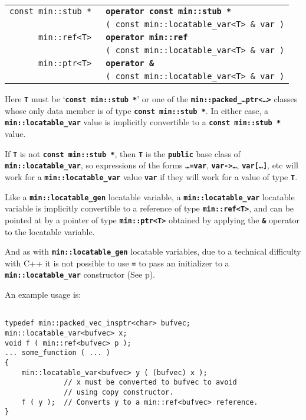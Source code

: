 \documentclass[12pt]{article}
\makeatletter
\newcommand{\TT}[1]{{\tt \bfseries #1}}
\newcommand{\ttomkey}[3]{\TT{operator #2}\index{#1@{\tt operator #2}!{#3}}}
\newcommand{\pagref}[1]{p\pageref{#1}}
\newcommand{\EOL}{\penalty \exhyphenpenalty}
\newcommand{\BRACKETED}[1]{{\tt <#1>}}
\newenvironment{indpar}[1][0.3in]%
	{\begin{list}{}%
		     {\setlength{\itemsep}{0in}%
		      \setlength{\topsep}{0in}%
		      \setlength{\parsep}{1ex}%
		      \setlength{\labelwidth}{#1}%
		      \setlength{\leftmargin}{#1}%
		      \addtolength{\leftmargin}{\labelsep}}%
	 \item}%
	{\end{list}}
\newcommand{\LABEL}[1]{\label{#1}}
\newlength{\ARGBREAKLENGTH}
\newcommand{\ARGBREAK}[1][\ARGBREAKLENGTH]{\\&\hspace*{#1}}
\newcommand{\TTOMKEY}[3]{\ttomkey{#1}{#2}{#3}}
\makeatother
\begin{document}
\begin{indpar}[0.1in]\begin{tabular}{r@{}l}
\verb|const min::stub * |
    & \TTOMKEY{const min::stub *}{const min::stub *}%
              {of {\tt min::locatable\_var\TARG}}\ARGBREAK
      \verb|( const min::locatable_var<T> & var )|
\LABEL{MIN::LOCATABLE_VAR_TO_STUB_PTR} \\
\verb|min::ref<T> |
    & \TTOMKEY{min::ref<T>}{min::ref\TARG}%
              {of {\tt min::locatable\_var\TARG}}\ARGBREAK
      \verb|( const min::locatable_var<T> & var )|
\LABEL{MIN::LOCATABLE_VAR_TO_REF_T} \\
\verb|min::ptr<T> |
    & \TTOMKEY{\&}{\&}%
              {of {\tt min::locatable\_var\TARG}}\ARGBREAK
      \verb|( const min::locatable_var<T> & var )|
\LABEL{MIN::AMPERSAND_LOCATABLE_VAR} \\
\end{tabular}\end{indpar}

Here \TT{T} must be
`\TT{const min::stub~*}'
or one of the \TT{min::\EOL packed\_\ldots ptr\BRACKETED{\ldots}} classes
whose only data member is of type \TT{const min::stub~*}.
In either case, a \TT{min::\EOL locatable\_\EOL var\TARG}
value is implicitly convertible to a \TT{const min::\EOL stub~*} value.

If \TT{T} is not \TT{const min::stub~*}, then \TT{T}
is the \TT{public} base class of
\TT{min::\EOL locatable\_\EOL var\TARG}, so expressions of
the forms \TT{\ldots=var},
\TT{var->\ldots}, \TT{var[\ldots]}, etc will work for a
\TT{min::\EOL locatable\_\EOL var\TARG} value \TT{var} if they
will work for a value of type \TT{T}.

Like a \TT{min::\EOL locatable\_\EOL gen} locatable variable,
a \TT{min::\EOL locatable\_\EOL var\TARG} locatable variable
is implicitly convertible to a
reference of type \TT{min::\EOL ref<T>}, and can be pointed at
by a pointer of type \TT{min::\EOL ptr<T>} obtained by applying
the \TT{\&} operator to the locatable variable.

And as with \TT{min::\EOL locatable\_\EOL gen} locatable variables,
due to a technical difficulty with C++ it is not possible to use
\TT{=} to pass an initializer
to a \TT{min::\EOL locatable\_\EOL var\TARG} constructor
(See \pagref{LOCATABLE-VAR-COPY-CONSTRUCTOR}).

An example usage is:

\begin{indpar}\begin{verbatim}

typedef min::packed_vec_insptr<char> bufvec;
min::locatable_var<bufvec> x;
void f ( min::ref<bufvec> p );
... some_function ( ... )
{
    min::locatable_var<bufvec> y ( (bufvec) x );
              // x must be converted to bufvec to avoid
              // using copy constructor.
    f ( y );  // Converts y to a min::ref<bufvec> reference.
}
\end{verbatim}\end{indpar}
\end{document}
